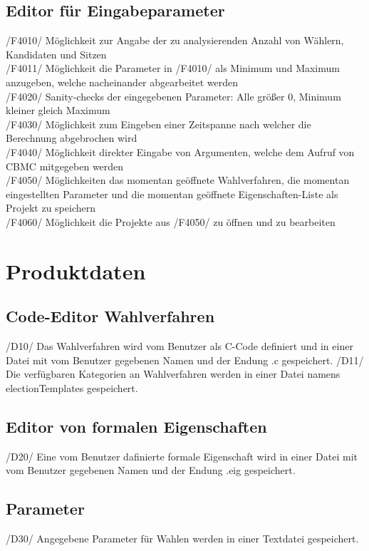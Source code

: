 \documentclass[a4paper]{scrreprt}
\begin{document}
\section{Editor für Eingabeparameter}
/F4010/ Möglichkeit zur Angabe der zu analysierenden Anzahl von Wählern, Kandidaten und Sitzen \\
/F4011/ Möglichkeit die Parameter in /F4010/ als Minimum und Maximum anzugeben, welche nacheinander abgearbeitet werden \\
/F4020/ Sanity-checks der eingegebenen Parameter: Alle größer 0, Minimum kleiner gleich Maximum \\
/F4030/ Möglichkeit zum Eingeben einer Zeitspanne nach welcher die Berechnung abgebrochen wird \\
/F4040/ Möglichkeit direkter Eingabe von Argumenten, welche dem Aufruf von CBMC mitgegeben werden \\
/F4050/ Möglichkeiten das momentan geöffnete Wahlverfahren, die momentan eingestellten Parameter und die momentan geöffnete Eigenschaften-Liste als Projekt zu speichern \\
/F4060/ Möglichkeit die Projekte aus /F4050/ zu öffnen und zu bearbeiten

\chapter{Produktdaten}
\section{Code-Editor Wahlverfahren}
/D10/ Das Wahlverfahren wird vom \gls{Benutzer} als C-Code definiert und in einer Datei mit vom \gls{Benutzer} gegebenen Namen und der Endung .c gespeichert.
/D11/ Die verfügbaren Kategorien an Wahlverfahren werden in einer Datei namens electionTemplates gespeichert.

\section{Editor von formalen Eigenschaften}
/D20/ Eine vom \gls{Benutzer} dafinierte formale Eigenschaft wird in einer Datei mit vom \gls{Benutzer} gegebenen Namen und der Endung .eig gespeichert.

\section{Parameter}
/D30/ Angegebene Parameter für Wahlen werden in einer Textdatei gespeichert.
\end{document}
